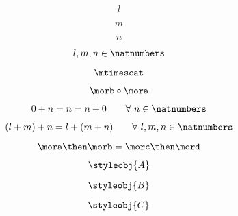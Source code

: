 {\begin{forslides}
        \begin{equation}
            \label{eq:38}
            l
        \end{equation}

        \begin{equation}
            \label{eq:39}
            m
        \end{equation}

        \begin{equation}
            \label{eq:40}
            n
        \end{equation}

        \begin{equation}
            \label{eq:41}
            l, m, n \in \natnumbers
        \end{equation}

        \begin{equation}
            \label{eq:42}
            \mtimescat
        \end{equation}

        \begin{equation}
            \label{eq:43}
            \morb \circ \mora
        \end{equation}

        \begin{equation}
            \label{eq:44}
            0 + n = n = n + 0   \quad \quad \forall \ n \in \natnumbers
        \end{equation}

        \begin{equation}
            \label{eq:45}
            (l + m) + n = l + (m + n) \quad \quad  \forall \ l, m, n \in \natnumbers
        \end{equation}

        \begin{equation}
            \label{eq:46}
            \mora \then \morb = \morc \then \mord
        \end{equation}

        \begin{equation}
            \label{eq:47}
            \styleobj{A}
        \end{equation}

        \begin{equation}
            \label{eq:48}
            \styleobj{B}
        \end{equation}

        \begin{equation}
            \label{eq:49}
            \styleobj{C}
        \end{equation}


\end{forslides}}
